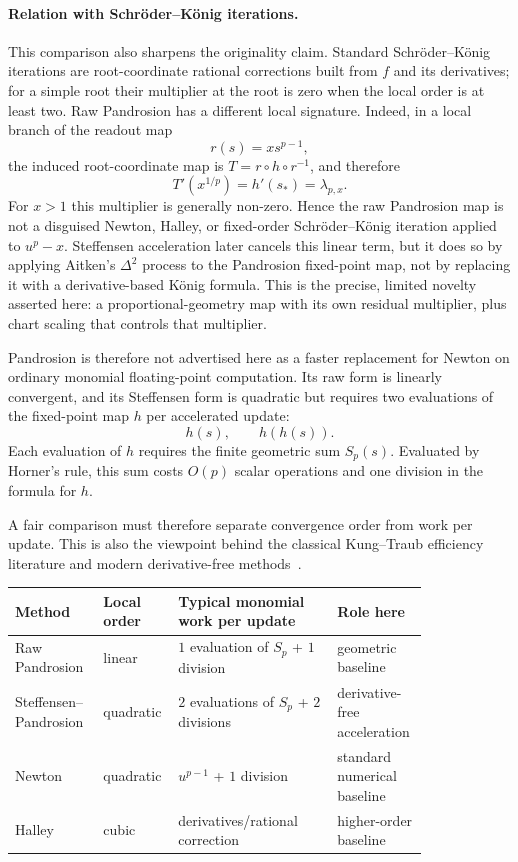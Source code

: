 \documentclass[10pt,a4paper]{article}
\theoremstyle{plain}
\theoremstyle{definition}
\theoremstyle{remark}
\begin{document}
\paragraph{Relation with Schröder--König iterations.}
This comparison also sharpens the originality claim.  Standard Schröder--König
iterations are root-coordinate rational corrections built from $f$ and its
derivatives; for a simple root their multiplier at the root is zero when the
local order is at least two.  Raw Pandrosion has a different local signature.
Indeed, in a local branch of the readout map
\[
  r(s)=x s^{p-1},
\]
the induced root-coordinate map is $T=r\circ h\circ r^{-1}$, and therefore
\[
  T'(x^{1/p})=h'(s_*)=\lambda_{p,x}.
\]
For $x>1$ this multiplier is generally non-zero.  Hence the raw Pandrosion map
is not a disguised Newton, Halley, or fixed-order Schröder--König iteration
applied to $u^p-x$.  Steffensen acceleration later cancels this linear term,
but it does so by applying Aitken's $\Delta^2$ process to the Pandrosion
fixed-point map, not by replacing it with a derivative-based König formula.
This is the precise, limited novelty asserted here: a proportional-geometry map
with its own residual multiplier, plus chart scaling that controls that
multiplier.

Pandrosion is therefore not advertised here as a faster replacement for Newton
on ordinary monomial floating-point computation.  Its raw form is linearly
convergent, and its Steffensen form is quadratic but requires two evaluations of
the fixed-point map $h$ per accelerated update:
\[
  h(s),\qquad h(h(s)).
\]
Each evaluation of $h$ requires the finite geometric sum $S_p(s)$.  Evaluated by
Horner's rule, this sum costs $O(p)$ scalar operations and one division in the
formula for $h$.

A fair comparison must therefore separate convergence order from work per
update.  This is also the viewpoint behind the classical Kung--Traub efficiency
literature and modern derivative-free methods~\cite{kungtraub,petkovic2013,cordero2013,sharma2014}.

\begin{center}
\scriptsize
\begin{tabular}{@{}>{\raggedright\arraybackslash}p{0.20\linewidth}>{\raggedright\arraybackslash}p{0.10\linewidth}>{\raggedright\arraybackslash}p{0.36\linewidth}>{\raggedright\arraybackslash}p{0.16\linewidth}@{}}
\toprule
Method & Local order & Typical monomial work per update & Role here \\
\midrule
Raw Pandrosion & linear & $1$ evaluation of $S_p$ + $1$ division & geometric baseline \\
Steffensen--Pandrosion & quadratic & $2$ evaluations of $S_p$ + $2$ divisions & derivative-free acceleration \\
Newton & quadratic & $u^{p-1}$ + $1$ division & standard numerical baseline \\
Halley & cubic & derivatives/rational correction & higher-order baseline \\
\bottomrule
\end{tabular}
\end{center}
\end{document}

